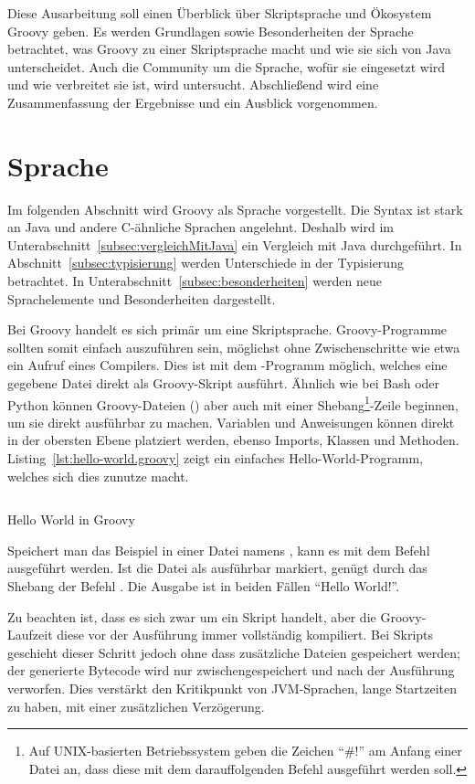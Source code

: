 \documentclass[a4paper]{article}
\newcommand{\outquote}[1]{``{#1}''}
\newcommand{\codelisting}[3]{\begin{listing}[htp]
	\inputminted{#1}{#1/#2}
	\vspace{-3ex}
	\caption{#3}
	\label{lst:#2}
\end{listing}}
\begin{document}
Diese Ausarbeitung soll einen Überblick über Skriptsprache und Ökosystem Groovy geben.
Es werden Grundlagen sowie Besonderheiten der Sprache betrachtet, was Groovy zu einer Skriptsprache macht und wie sie sich von Java unterscheidet.
Auch die Community um die Sprache, wofür sie eingesetzt wird und wie verbreitet sie ist, wird untersucht.
Abschließend wird eine Zusammenfassung der Ergebnisse und ein Ausblick vorgenommen.


\section{Sprache}\label{sec:sprache}

Im folgenden Abschnitt wird Groovy als Sprache vorgestellt.
Die Syntax ist stark an Java und andere C-ähnliche Sprachen angelehnt.
Deshalb wird im Unterabschnitt~\ref{subsec:vergleichMitJava} ein Vergleich mit Java durchgeführt.
In Abschnitt~\ref{subsec:typisierung} werden Unterschiede in der Typisierung betrachtet.
In Unterabschnitt~\ref{subsec:besonderheiten} werden neue Sprachelemente und Besonderheiten dargestellt.

Bei Groovy handelt es sich primär um eine Skriptsprache.
Groovy-Programme sollten somit einfach auszuführen sein, möglichst ohne Zwischenschritte wie etwa ein Aufruf eines Compilers.
Dies ist mit dem -Programm möglich, welches eine gegebene Datei direkt als Groovy-Skript ausführt.
Ähnlich wie bei Bash oder Python können Groovy-Dateien () aber auch mit einer Shebang\footnote{Auf UNIX-basierten Betriebssystem geben die Zeichen ``\#!'' am Anfang einer Datei an, dass diese mit dem darauffolgenden Befehl ausgeführt werden soll.}-Zeile beginnen, um sie direkt ausführbar zu machen.
Variablen und Anweisungen können direkt in der obersten Ebene platziert werden, ebenso Imports, Klassen und Methoden.
Listing~\ref{lst:hello-world.groovy} zeigt ein einfaches Hello-World-Programm, welches sich dies zunutze macht.

\codelisting{groovy}{hello-world.groovy}{Hello World in Groovy}

Speichert man das Beispiel in einer Datei namens , kann es mit dem Befehl  ausgeführt werden.
Ist die Datei als ausführbar markiert, genügt durch das Shebang der Befehl .
Die Ausgabe ist in beiden Fällen \outquote{Hello World!}.

Zu beachten ist, dass es sich zwar um ein Skript handelt, aber die Groovy-Laufzeit diese vor der Ausführung immer vollständig kompiliert.
Bei Skripts geschieht dieser Schritt jedoch ohne dass zusätzliche Dateien gespeichert werden;
der generierte Bytecode wird nur zwischengespeichert und nach der Ausführung verworfen.
Dies verstärkt den Kritikpunkt von JVM-Sprachen, lange Startzeiten zu haben, mit einer zusätzlichen Verzögerung.
\end{document}
